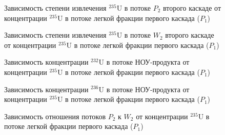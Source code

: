 {\begin{figure}[ht]
    \centering
    \begin{minipage}{.5\textwidth}
        \centering
        
  \caption{{Зависимость степени извлечения $^{235}$U в потоке $P_2$ второго каскаде от концентрации $^{235}$U в потоке легкой фракции первого каскада ($P_1$){\label{EX_P2}}}}
  \end{minipage}%
    \begin{minipage}{.5\textwidth}
      \centering
      
\caption{{Зависимость степени извлечения $^{235}$U в потоке $W_2$ второго каскаде от концентрации $^{235}$U в потоке легкой фракции первого каскада ($P_1$){\label{EX_W2}}}}
    \end{minipage}
\end{figure}

\begin{figure}[ht]
  \centering
  \begin{minipage}{.5\textwidth}
    \centering
    
    \caption{{Зависимость концентрации $^{232}$U в потоке НОУ-продукта от концентрации $^{235}$U в потоке легкой фракции первого каскада ($P_1$){\label{C232P}}}}
  \end{minipage}%
  \begin{minipage}{.5\textwidth}
    \centering
    
    \caption{{Зависимость концентрации $^{236}$U в потоке НОУ-продукта от концентрации $^{235}$U в потоке легкой фракции первого каскада ($P_1$){\label{C236P}}}}
\end{minipage}
\end{figure}

\begin{figure}[ht]
    \centering
      
    \caption{Зависимость отношения потоков $P_2$ к $W_2$ от концентрации $^{235}$U в потоке легкой фракции первого каскада ($P_1$)}\label{P2W2}
\end{figure}

}
